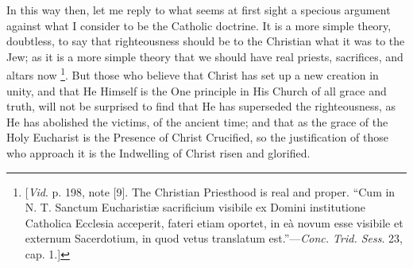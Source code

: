 In this way then, let me reply to what seems at first sight a
specious argument against what I consider to be the Catholic doctrine.
It is a more simple theory, doubtless, to say that righteousness
should be to the Christian what it was to the Jew; as it is a more
simple theory that we should have real priests, sacrifices, and altars
now \footnote{[\emph{Vid}.
p. 198, note [9]. The Christian Priesthood is real and proper.
``Cum in N. T. Sanctum Eucharistiæ sacrificium visibile ex Domini
institutione Catholica Ecclesia acceperit, fateri etiam oportet, in
eà novum esse visibile et externum Sacerdotium, in quod vetus
translatum est.''—\emph{Conc. Trid. Sess}. 23, cap. 1.]}. But those who
believe that Christ has set up a new creation in unity, and that He
Himself is the One principle in His Church of all grace and truth,
will not be surprised to find that He has superseded the
righteousness, as He has abolished the victims, of the ancient time;
and that as the grace of the Holy Eucharist is the Presence of Christ
Crucified, so the justification of those who approach it is the
Indwelling of Christ risen and glorified.


